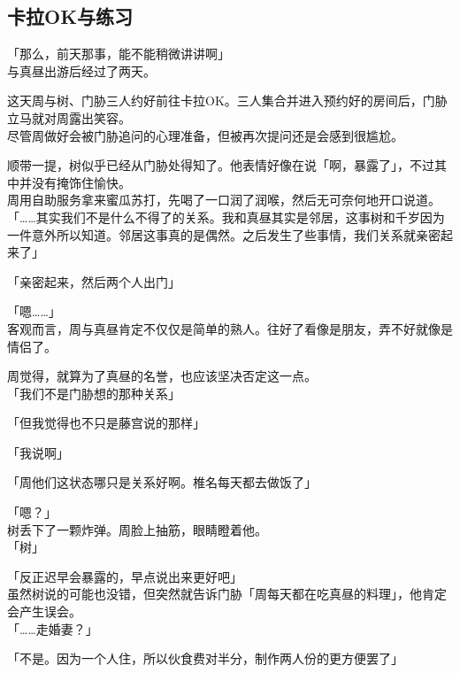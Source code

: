 \subsection{卡拉OK与练习}

「那么，前天那事，能不能稍微讲讲啊」\\

与真昼出游后经过了两天。

这天周与树、门胁三人约好前往卡拉OK。三人集合并进入预约好的房间后，门胁立马就对周露出笑容。\\

尽管周做好会被门胁追问的心理准备，但被再次提问还是会感到很尴尬。

顺带一提，树似乎已经从门胁处得知了。他表情好像在说「啊，暴露了」，不过其中并没有掩饰住愉快。\\

周用自助服务拿来蜜瓜苏打，先喝了一口润了润喉，然后无可奈何地开口说道。\\

「……其实我们不是什么不得了的关系。我和真昼其实是邻居，这事树和千岁因为一件意外所以知道。邻居这事真的是偶然。之后发生了些事情，我们关系就亲密起来了」

「亲密起来，然后两个人出门」

「嗯……」\\

客观而言，周与真昼肯定不仅仅是简单的熟人。往好了看像是朋友，弄不好就像是情侣了。

周觉得，就算为了真昼的名誉，也应该坚决否定这一点。\\

「我们不是门胁想的那种关系」

「但我觉得也不只是藤宫说的那样」

「我说啊」

「周他们这状态哪只是关系好啊。椎名每天都去做饭了」

「嗯？」\\

树丢下了一颗炸弹。周脸上抽筋，眼睛瞪着他。\\

「树」

「反正迟早会暴露的，早点说出来更好吧」\\

虽然树说的可能也没错，但突然就告诉门胁「周每天都在吃真昼的料理」，他肯定会产生误会。\\

「……走婚妻？」

「不是。因为一个人住，所以伙食费对半分，制作两人份的更方便罢了」

